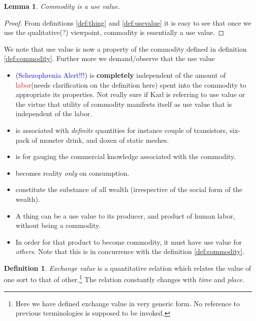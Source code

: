 \documentclass[12pt]{extarticle}
\newtheorem{lemma}[theorem]{Lemma}
\theoremstyle{definition}
\newtheorem{definition}{Definition}[section]
\newenvironment{remark}[1][Remark]{\begin{trivlist}
\item[\hskip \labelsep {\bfseries #1}]}{\end{trivlist}}
\begin{document}
  \begin{lemma}
    Commodity is a use value.
    \end{lemma}
  \begin{proof}
    From definitions \ref{def:thing} and \ref{def:usevalue} it is easy to see that once we use the qualitative(?) viewpoint, commodity is essentially a use value.
  \end{proof}
  \begin{remark}
    We note that use value is now a property of the commodity defined in definition \ref{def:commodity}.  Further more we demand/observe that the use value
    \begin{itemize}
    \item (\textcolor{blue}{Schezophrenia Alert!!!}) is \textbf{completely} independent of the amount of \textcolor{red}{labor}(needs clarification on the definition here) spent into the commodity to appropriate its properties.  Not really sure if Karl is referring to use value or the virtue that utility of commodity manifests itself as use value that is independent of the labor.
    \item  is associated with \emph{definite} quantities for instance couple of transistors, six-pack of monster drink, and dozen of static meshes.
    \item is for gauging the commercial knowledge associated with the commodity.
    \item becomes reality \emph{only} on consumption.
    \item constitute the substance of all wealth (irrespective of the social form of the wealth).
    \item A thing can be a use value to its producer, and product of human labor, without being a commodity.
      \item In order for that product to become commodity, it must have use value for \emph{others}.  Note that this is in concurrence with the definition \ref{def:commodity}.
    \end{itemize}
  \end{remark}

  \begin{definition}
    \label{def:exchval}
    \emph{Exchange value} is a quantitative relation which relates the value of one sort to that of other.\footnote{Here we have defined exchange value in very generic form.  No reference to previous terminologies is supposed to be invoked.}  The relation constantly changes with \emph{time} and \emph{place}.
  \end{definition}
\end{document}
